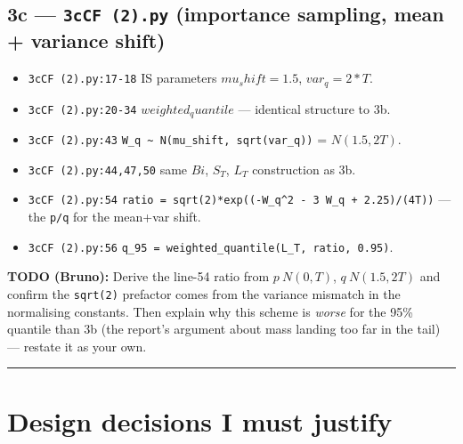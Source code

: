 \documentclass[
  11pt,
]{article}
\providecommand{\tightlist}{%
  \setlength{\itemsep}{0pt}\setlength{\parskip}{0pt}}
\begin{document}
\hypertarget{c-3ccf-2.py-importance-sampling-mean-variance-shift}{%
\subsection{\texorpdfstring{3c --- \texttt{3cCF\ (2).py} (importance
sampling, mean + variance
shift)}{3c --- 3cCF (2).py (importance sampling, mean + variance shift)}}\label{c-3ccf-2.py-importance-sampling-mean-variance-shift}}

\begin{itemize}
\tightlist
\item
  \texttt{3cCF\ (2).py:17-18} IS parameters \(mu_shift = 1.5\),
  \(var_q = 2*T\).
\item
  \texttt{3cCF\ (2).py:20-34} \(weighted_quantile\) --- identical
  structure to 3b.
\item
  \texttt{3cCF\ (2).py:43}
  \texttt{W\_q\ \textasciitilde{}\ N(mu\_shift,\ sqrt(var\_q))} =
  \(N(1.5, 2T)\).
\item
  \texttt{3cCF\ (2).py:44,47,50} same \(Bi\), \(S_T\), \(L_T\)
  construction as 3b.
\item
  \texttt{3cCF\ (2).py:54}
  \texttt{ratio\ =\ sqrt(2)*exp((-W\_q\^{}2\ -\ 3\ W\_q\ +\ 2.25)/(4T))}
  --- the \texttt{p/q} for the mean+var shift.
\item
  \texttt{3cCF\ (2).py:56}
  \texttt{q\_95\ =\ weighted\_quantile(L\_T,\ ratio,\ 0.95)}.
\end{itemize}

\textbf{TODO (Bruno):} Derive the line-54 ratio from \(p ~ N(0,T)\),
\(q ~ N(1.5, 2T)\) and confirm the \texttt{sqrt(2)} prefactor comes from
the variance mismatch in the normalising constants. Then explain why
this scheme is \emph{worse} for the 95\% quantile than 3b (the report's
argument about mass landing too far in the tail) --- restate it as your
own.

\begin{center}\rule{0.5\linewidth}{0.5pt}\end{center}

\hypertarget{design-decisions-i-must-justify}{%
\section{Design decisions I must
justify}\label{design-decisions-i-must-justify}}
\end{document}
